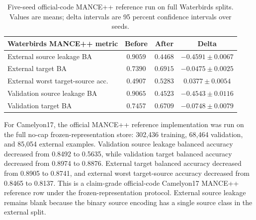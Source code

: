 \documentclass[10pt]{article}
\begin{document}
\begin{table}[t]
\centering
\begin{tabular}{lccc}
\toprule
Waterbirds MANCE++ metric & Before & After & Delta \\
\midrule
External source leakage BA & $0.9059$ & $0.4468$ & $-0.4591 \pm 0.0067$ \\
External target BA & $0.7390$ & $0.6915$ & $-0.0475 \pm 0.0025$ \\
External worst target-source acc. & $0.4907$ & $0.5283$ & $0.0377 \pm 0.0054$ \\
Validation source leakage BA & $0.9065$ & $0.4523$ & $-0.4543 \pm 0.0116$ \\
Validation target BA & $0.7457$ & $0.6709$ & $-0.0748 \pm 0.0079$ \\
\bottomrule
\end{tabular}
\caption{Five-seed official-code MANCE++ reference run on full Waterbirds
splits. Values are means; delta intervals are 95 percent confidence intervals
over seeds.}
\label{tab:mance}
\end{table}

For Camelyon17, the official MANCE++ reference implementation was run on the
full no-cap frozen-representation store: 302,436 training, 68,464 validation,
and 85,054 external examples. Validation source leakage balanced accuracy
decreased from 0.8492 to 0.5635, while validation target balanced accuracy
decreased from 0.8974 to 0.8876. External target balanced accuracy decreased
from 0.8905 to 0.8741, and external worst target-source accuracy decreased
from 0.8465 to 0.8137. This is a claim-grade official-code Camelyon17 MANCE++
reference row under the frozen-representation protocol. External source
leakage remains blank because the binary source encoding has a single source
class in the external split.
\end{document}
